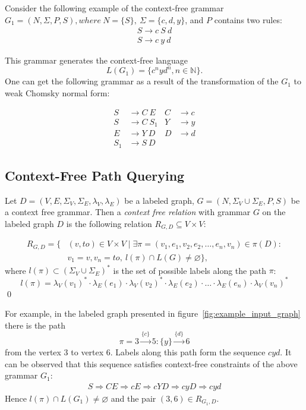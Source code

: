 Consider the following example of the context-free grammar $G_1=(N, \Sigma, P, S), where ~N=\{S\},~\Sigma=\{c, d, y\}$, and $P$ contains two rules: 
\begin{align}
\label{eqn:g1_example}
S \rightarrow c \ S \ d \nonumber\\
S \rightarrow c \ y \ d
\end{align}

This grammar generates the context-free language $$L(G_1) = \{c^nyd^n, n \in \mathbb{N}\}.$$
One can get the following grammar as a result of the transformation of the $G_1$ to weak Chomsky normal form:

\begin{align*}
S& \to C \ E   & C& \to c   \\
S& \to C \ S_1 & Y& \to y   \\
E& \to Y \ D   & D& \to d   \\ 
S_1& \to S \ D &&
\end{align*}


\subsection{Context-Free Path Querying}

\begin{definition}
Let $D = (V, E, \Sigma_V, \Sigma_E, \lambda_V, \lambda_E)$ be a labeled graph, $G = (N, \Sigma_V \cup \Sigma_E, P, S)$ be a context free grammar. Then a \emph{context free relation} with grammar $G$ on the labeled graph $D$ is the following relation $R_{G, D} \subseteq V \times V$:

\begin{equation*} \label{eq1}
\begin{split}
R_{G, D} = \{&(v, to) \in V \times V \mid \exists \pi = (v_1, e_1, v_2, e_2, \ldots, e_n, v_n) \in \pi(D): \\
      &v_1 = v, v_n = to,~l(\pi) \cap L(G) \neq \varnothing \},
\end{split}
\end{equation*}
where $l(\pi) \subset (\Sigma_V \cup \Sigma_E)^*$ is the set of possible labels along the path $\pi$:
$$l(\pi) = \lambda_V(v_1)^* \cdot \lambda_E(e_1) \cdot \lambda_V(v_2)^* \cdot \lambda_E(e_2) \cdot \ldots \cdot \lambda_E(e_n) \cdot \lambda_V(v_n)^*$$
\qed
\end{definition}


For example, in the labeled graph presented in figure~\ref{fig:example_input_graph} there is the path $$\pi=3 \xrightarrow{\{c\}} 5:\{y\} \xrightarrow{\{d\}} 6$$ from the vertex 3 to vertex 6.
Labels along this path form the sequence $cyd$.
It can be observed that this sequence satisfies context-free constraints of the above grammar $G_1$:
    \begin{align*}
         S \Rightarrow CE \Rightarrow cE \Rightarrow cYD \Rightarrow cyD \Rightarrow cyd
    \end{align*}
Hence $l(\pi) \cap L(G_1) \neq \varnothing$ and the pair $(3,6) \in R_{G_1, D}$.

